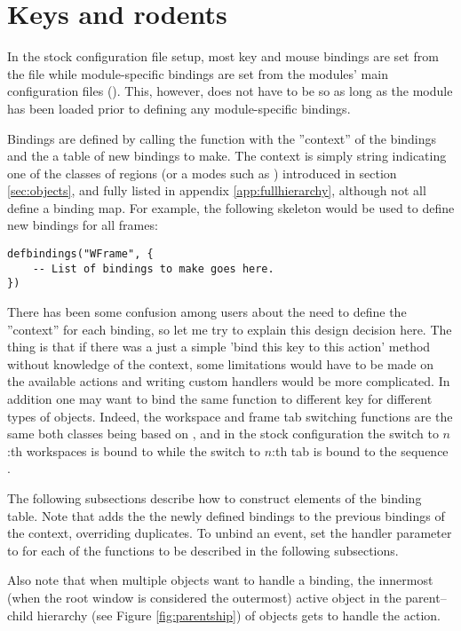 \section{Keys and rodents}
\label{sec:bindings}

In the stock configuration file setup, most key and mouse bindings are set
from the file  while module-specific bindings
are set from the modules' main configuration files ().
This, however, does not have to be so as long as the module has been
loaded prior to defining any module-specific bindings.

Bindings are defined by calling the function 
 with the ''context'' of the
bindings and the a table of new bindings to make. The context is simply
string indicating one of the classes of regions (or a modes such as
) introduced in section \ref{sec:objects}, and fully
listed in appendix \ref{app:fullhierarchy}, although not all define
a binding map. For example, the following skeleton would be used to 
define new bindings for all frames:

\begin{verbatim}
defbindings("WFrame", {
    -- List of bindings to make goes here.
})
\end{verbatim}

There has been some confusion among users about the need to define the
''context'' for each binding, so let me try to explain this design
decision here. The thing is that if there was a just a simple 'bind this 
key to this action' method without knowledge of the context, some 
limitations would have to be made on the available actions and writing 
custom handlers would be more complicated. In addition one may want to 
bind the same function to different key for different types of objects.
Indeed, the workspace and frame tab switching functions are the same both
classes being based on , and in the stock configuration the 
switch to $n$:th workspaces is bound to  while the switch to 
$n$:th tab is bound to the sequence .

The following subsections describe how to construct elements of the
binding table. Note that  adds
the the newly defined bindings to the previous bindings of the context,
overriding duplicates. To unbind an event, set the handler parameter
to  for each of the functions to be described in the following
subsections.

Also note that when multiple objects want to handle a binding, the 
innermost (when the root window is considered the outermost) active object
in the parent--child hierarchy (see Figure \ref{fig:parentship}) of objects 
gets to handle the action.


